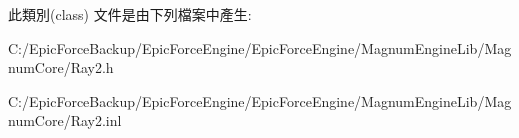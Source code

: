 此類別(class) 文件是由下列檔案中產生\+:\begin{DoxyCompactItemize}
\item 
C\+:/\+Epic\+Force\+Backup/\+Epic\+Force\+Engine/\+Epic\+Force\+Engine/\+Magnum\+Engine\+Lib/\+Magnum\+Core/Ray2.\+h\item 
C\+:/\+Epic\+Force\+Backup/\+Epic\+Force\+Engine/\+Epic\+Force\+Engine/\+Magnum\+Engine\+Lib/\+Magnum\+Core/Ray2.\+inl\end{DoxyCompactItemize}

